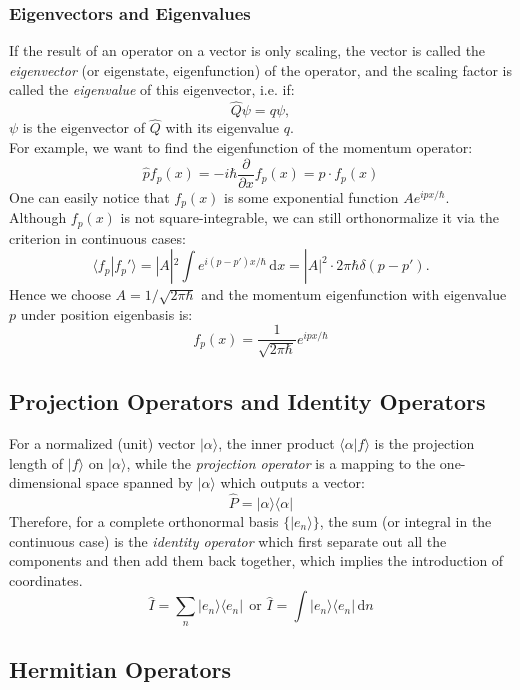 	\subsubsection{Eigenvectors and Eigenvalues}
	If the result of an operator on a vector is only scaling, 
	the vector is called the \emph{eigenvector} (or eigenstate, eigenfunction) of the operator, 
	and the scaling factor is called the \emph{eigenvalue} of this eigenvector, i.e. if:
	\[\hat{Q}\psi = q\psi,\]
	$\psi$ is the eigenvector of $\hat{Q}$ with its eigenvalue $q$.\\
	For example, we want to find the eigenfunction of the momentum operator:
	\[\hat{p}f_p(x) = -i\hbar\frac{\partial}{\partial x}f_p(x) = p\cdot f_p(x)\]
	One can easily notice that $f_p(x)$ is some exponential function $Ae^{ipx/\hbar}$.\\
	Although $f_p(x)$ is not square-integrable, we can still orthonormalize it via the criterion in continuous cases:
	\[\langle f_p|f_p' \rangle = |A|^2\int\!e^{i(p-p')x/\hbar} \,\text{d}x = |A|^2 \cdot 2\pi\hbar\delta(p-p').\]
	Hence we choose $A=1/\sqrt{2\pi\hbar}$ and the momentum eigenfunction with eigenvalue $p$ under position eigenbasis is:
	\[f_p(x) = \frac{1}{\sqrt{2\pi\hbar}}e^{ipx/\hbar}\]
	
	\subsection{Projection Operators and Identity Operators}\label{identity}
	For a normalized (unit) vector $|\alpha\rangle$, 
	the inner product $\langle \alpha | f \rangle $ is the projection length of $|f\rangle$ on $|\alpha\rangle$, 
	while the \emph{projection operator} is a mapping to the one-dimensional space spanned by $|\alpha\rangle$ which outputs a vector:
	\[\hat{P} = |\alpha\rangle\langle\alpha|\]
	Therefore, for a complete orthonormal basis $\{|e_n\rangle\}$, 
	the sum (or integral in the continuous case) is the \emph{identity operator} 
	which first separate out all the components and then add them back together, which implies the introduction of coordinates.
	\[\hat{I} = \sum_{n}|e_n\rangle\langle e_n| \ \ \text{or  }\hat{I} =\! \int|e_n\rangle\langle e_n|\,\text{d}n\]
	
	\subsection{Hermitian Operators}

